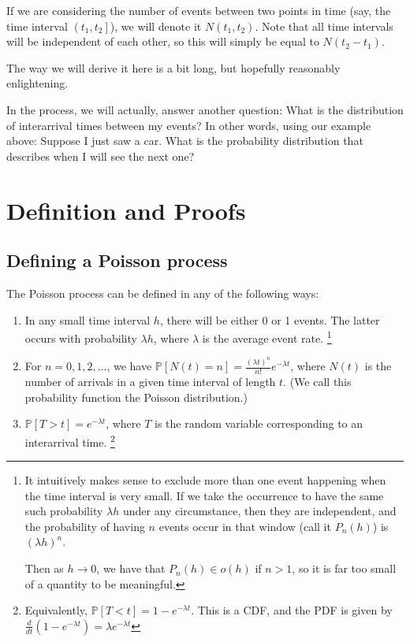 \documentclass{article}
\begin{document}
If we are considering the number of events between two points in time (say, the time interval $\left(t_1, t_2\right]$), we will denote it $N(t_1, t_2)$. Note that all time intervals will be independent of each other, so this will simply be equal to $N(t_2 - t_1)$. 

The way we will derive it here is a bit long, but hopefully reasonably enlightening. 

In the process, we will actually, answer another question: What is the distribution of interarrival times between my events? In other words, using our example above: Suppose I just saw a car. What is the probability distribution that describes when I will see the next one?


\section{Definition and Proofs}

\subsection{Defining a Poisson process}

The Poisson process can be defined in any of the following ways:

\begin{enumerate}
\item In any small time interval $h$, there will be either 0 or 1 events. The latter occurs with probability $\lambda h$, where $\lambda$ is the average event rate. \footnote{It intuitively makes sense to exclude more than one event happening when the time interval is very small. If we take the occurrence to have the same such probability $\lambda h$ under any circumstance, then they are independent, and the probability of having $n$ events occur in that window (call it $P_n(h)$) is $(\lambda h)^n$. 

Then as $h \rightarrow 0$, we have that $P_n(h) \in o(h)$ if $n > 1$, so it is far too small of a quantity to be meaningful.} 
\item For $n = 0, 1, 2, ...$, we have $\mathbb{P}[N(t) = n] = \frac{(\lambda t)^n}{n!}e^{-\lambda t}$, where $N(t)$ is the number of arrivals in a given time interval of length $t$. (We call this probability function the Poisson distribution.)
\item $\mathbb{P}[T > t] = e^{-\lambda t}$, where $T$ is the random variable corresponding to an interarrival time. \footnote{Equivalently, $\mathbb{P}[T < t] = 1 - e^{-\lambda t}$. This is a CDF, and the PDF is given by $\frac{d}{dt}(1 - e^{-\lambda t}) = \lambda e^{-\lambda t}$}
\end{enumerate}
\end{document}

